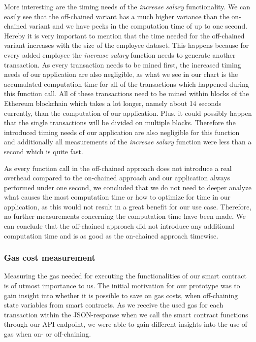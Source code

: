 More interesting are the timing needs of the \textit{increase salary} functionality.
We can easily see that the off-chained variant has a much higher variance than the on-chained variant and we have peeks in the computation time of up to one second.
Hereby it is very important to mention that the time needed for the off-chained variant increases with the size of the employee dataset.
This happens because for every added employee the \textit{increase salary} function needs to generate another transaction.
As every transaction needs to be mined first, the increased timing needs of our application are also negligible, as what we see in our chart is the accumulated computation time for all of the transactions which happened during this function call.
All of these transactions need to be mined within blocks of the Ethereum blockchain which takes a lot longer, namely about 14 seconds currently, than the computation of our application.
Plus, it could possibly happen that the single transactions will be divided on multiple blocks.
Therefore the introduced timing needs of our application are also negligible for this function and additionally all measurements of the \textit{increase salary} function were less than a second which is quite fast.%

As every function call in the off-chained approach does not introduce a real overhead compared to the on-chained approach and our application always performed under one second, we concluded that we do not need to deeper analyze what causes the most computation time or how to optimize for time in our application, as this would not result in a great benefit for our use case.
Therefore, no further measurements concerning the computation time have been made.
We can conclude that the off-chained approach did not introduce any additional computation time and is as good as the on-chained approach timewise.

\subsubsection{Gas cost measurement}
Measuring the gas needed for executing the functionalities of our smart contract is of utmost importance to us.
The initial motivation for our prototype was to gain insight into whether it is possible to save on gas costs, when off-chaining state variables from smart contracts.
As we receive the used gas for each transaction within the JSON-response when we call the smart contract functions through our API endpoint, we were able to gain different insights into the use of gas when on- or off-chaining.

